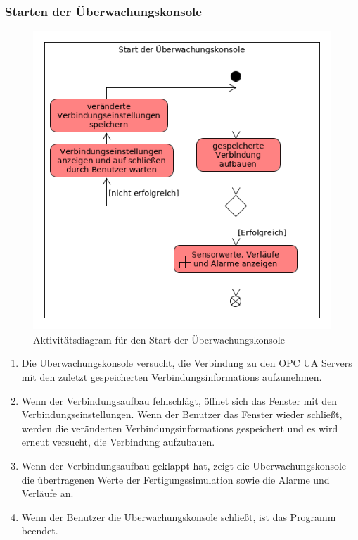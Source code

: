 \documentclass[parskip=full]{scrartcl}
\begin{document}
\subsubsection{Starten der Überwachungskonsole}
\label{console-launch}
\begin{figure}[H]
  \centering
  \includegraphics[scale=0.62]{media/Activities/launch-console.png}
  \caption{Aktivitätsdiagram für den Start der Überwachungskonsole}
\end{figure}
\begin{enumerate}[noitemsep]
 \item Die \gls{Uberwachungskonsole} versucht, die Verbindung zu den \glspl{OPC UA Server} mit den zuletzt gespeicherten \glspl{Verbindungsinformation} aufzunehmen.
 \item Wenn der Verbindungsaufbau fehlschlägt, öffnet sich das Fenster mit den Verbindungseinstellungen. Wenn der Benutzer das Fenster wieder schließt,
 werden die veränderten \glspl{Verbindungsinformation} gespeichert und es wird erneut versucht, die Verbindung aufzubauen.
 \item Wenn der Verbindungsaufbau geklappt hat, zeigt die \gls{Uberwachungskonsole} die übertragenen Werte der \gls{Fertigungssimulation} sowie die
 Alarme und Verläufe an.
 \item Wenn der Benutzer die \gls{Uberwachungskonsole} schließt, ist das Programm beendet.
\end{enumerate}
\end{document}
